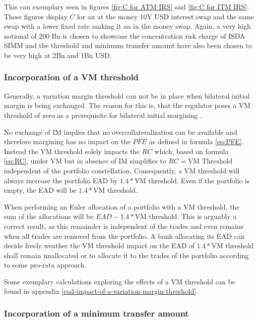 \documentclass[../Thesis_AHoecherl.tex]{subfiles}
\begin{document}
    This can exemplary seen in figures \ref{fig:C for ATM IRS} and \ref{fig:C for ITM IRS}. These figures display $C$ for an at the money 10Y USD interest swap and the same swap with a lower fixed rate making it an in the money swap. Again, a very high notional of 200 Bn is chosen to showcase the concentration risk charge of \gls{ISDA SIMM} and the threshold and minimum transfer amount have also been chosen to be very high at 2Bn and 1Bn USD.

    \subsubsection{Incorporation of a VM threshold\label{sec:Incorporation of a VM threshold}}
    
    Generally, a variation margin threshold can not be in place when bilateral initial margin is being exchanged. The reason for this is, that the regulator poses a VM threshold of zero as a prerequisite for bilateral initial margining \cite[Requirement 2.1]{BCBS_MarginRequirements}.

    No exchange of IM implies that no overcollateralization can be available and therefore margining has no impact on the $PFE$ as defined in formula \ref{eq:PFE}. Instead the VM threshold solely impacts the $RC$ which, based on formula \ref{eq:RC}, under VM but in absence of IM simplifies to $RC = \text{VM Threshold}$ independent of the portfolio constellation. 
    Consequently, a VM threshold will always increase the portfolio EAD by $1.4*\text{VM threshold}$. Even if the portfolio is empty, the EAD will be $1.4 * \text{VM threshold}$.

    When performing an Euler allocation of a portfolio with a VM threshold, the sum of the allocations will be $EAD - 1.4 * \text{VM threshold}$. This is arguably a correct result, as this remainder is independent of the trades and even remains when all trades are removed from the portfolio. 
    A bank allocating its EAD can decide freely weather the VM threshold impact on the EAD of $1.4 * \text{VM threshold}$ shall remain unallocated or to allocate it to the trades of the portfolio according to some pro-rata approach.

    Some exemplary calculations exploring the effects of a VM threshold can be found in appendix \ref{ead-impact-of-a-variation-margin-threshold}.
    
    \subsubsection{Incorporation of a minimum transfer amount}
\end{document}
